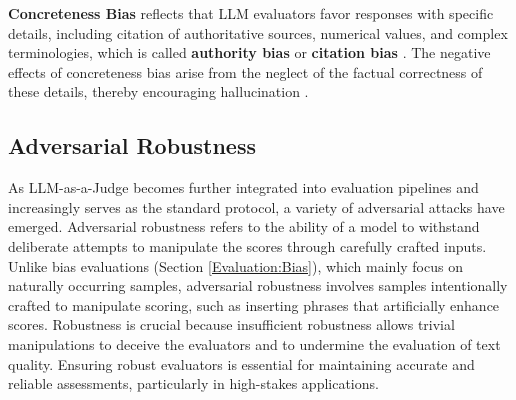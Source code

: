 \textbf{Concreteness Bias} reflects that LLM evaluators favor responses with specific details, including citation of authoritative sources, numerical values, and complex terminologies, which is called \textbf{authority bias} \cite{offsetbias} or \textbf{citation bias} \cite{chen2024humans,ye2024justice}.
The negative effects of concreteness bias arise from the neglect of the factual correctness of these details, thereby encouraging hallucination \citep{agrawal2023language}.


\subsection{Adversarial Robustness}
\label{Evaluation:Robustness}
As LLM-as-a-Judge becomes further integrated into evaluation pipelines and increasingly serves as the standard protocol, a variety of adversarial attacks have emerged.
Adversarial robustness refers to the ability of a model to withstand deliberate attempts to manipulate the scores through carefully crafted inputs.
Unlike bias evaluations (Section \ref{Evaluation:Bias}), which mainly focus on naturally occurring samples, adversarial robustness involves samples intentionally crafted to manipulate scoring, such as inserting phrases that artificially enhance scores. 
Robustness is crucial because insufficient robustness allows trivial manipulations to deceive the evaluators and to undermine the evaluation of text quality. 
Ensuring robust evaluators is essential for maintaining accurate and reliable assessments, particularly in high-stakes applications.

